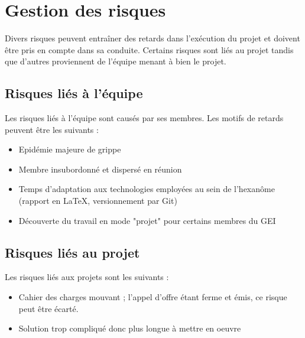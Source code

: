 \section{Gestion des risques}

Divers risques peuvent entraîner des retards dans l'exécution du projet et
doivent être pris en compte dans sa conduite. Certains risques sont liés au
projet tandis que d'autres proviennent de l'équipe menant à bien le projet.

\subsection{Risques liés à l'équipe}

Les risques liés à l'équipe sont causés par ses membres. Les motifs de
retards peuvent être les suivants :

\begin{itemize}

\item Epidémie majeure de grippe
\item Membre insubordonné et dispersé en réunion
\item Temps d'adaptation aux technologies employées au sein de l'hexanôme
(rapport en \LaTeX, versionnement par Git)
\item Découverte du travail en mode "projet" pour certains membres du GEI

\end{itemize}


\subsection{Risques liés au projet}

Les risques liés aux projets sont les suivants :

\begin{itemize}

\item Cahier des charges mouvant ; l'appel d'offre étant ferme et émis, ce
risque peut être écarté.
\item Solution trop compliqué donc plus longue à mettre en oeuvre

\end{itemize}

\pagebreak
